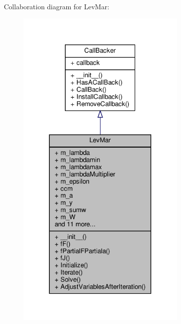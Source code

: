 Collaboration diagram for Lev\+Mar\+:\nopagebreak
\begin{figure}[H]
\begin{center}
\leavevmode
\includegraphics[width=236pt]{classSignalIntegrity_1_1Fit_1_1LevMar_1_1LevMar__coll__graph}
\end{center}
\end{figure}
